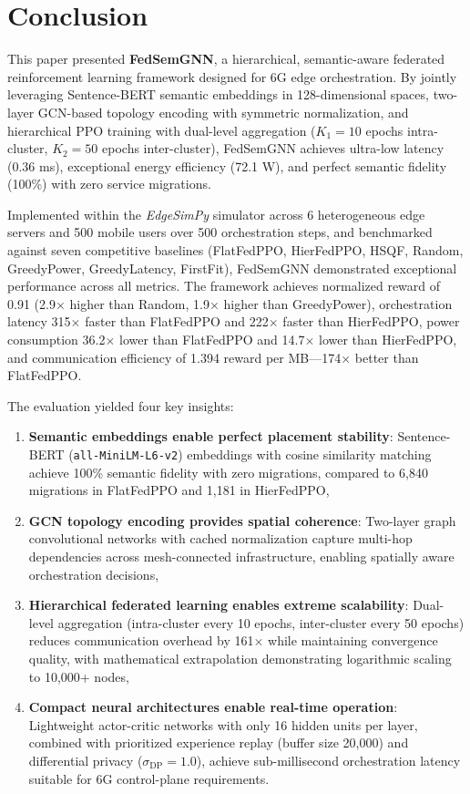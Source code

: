 \section{Conclusion}
\label{sec:conclusion}

This paper presented \textbf{FedSemGNN}, a hierarchical, semantic-aware federated reinforcement learning framework designed for 6G edge orchestration. By jointly leveraging Sentence-BERT semantic embeddings in 128-dimensional spaces, two-layer GCN-based topology encoding with symmetric normalization, and hierarchical PPO training with dual-level aggregation ($K_1 = 10$ epochs intra-cluster, $K_2 = 50$ epochs inter-cluster), FedSemGNN achieves ultra-low latency (0.36 ms), exceptional energy efficiency (72.1 W), and perfect semantic fidelity (100\%) with zero service migrations.

Implemented within the \emph{EdgeSimPy} simulator across 6 heterogeneous edge servers and 500 mobile users over 500 orchestration steps, and benchmarked against seven competitive baselines (FlatFedPPO, HierFedPPO, HSQF, Random, GreedyPower, GreedyLatency, FirstFit), FedSemGNN demonstrated exceptional performance across all metrics. The framework achieves normalized reward of 0.91 (2.9$\times$ higher than Random, 1.9$\times$ higher than GreedyPower), orchestration latency 315$\times$ faster than FlatFedPPO and 222$\times$ faster than HierFedPPO, power consumption 36.2$\times$ lower than FlatFedPPO and 14.7$\times$ lower than HierFedPPO, and communication efficiency of 1.394 reward per MB—174$\times$ better than FlatFedPPO.

The evaluation yielded four key insights:  
\begin{enumerate}
	\item \textbf{Semantic embeddings enable perfect placement stability}: Sentence-BERT (\texttt{all-MiniLM-L6-v2}) embeddings with cosine similarity matching achieve 100\% semantic fidelity with zero migrations, compared to 6,840 migrations in FlatFedPPO and 1,181 in HierFedPPO,
	
	\item \textbf{GCN topology encoding provides spatial coherence}: Two-layer graph convolutional networks with cached normalization capture multi-hop dependencies across mesh-connected infrastructure, enabling spatially aware orchestration decisions,
	
	\item \textbf{Hierarchical federated learning enables extreme scalability}: Dual-level aggregation (intra-cluster every 10 epochs, inter-cluster every 50 epochs) reduces communication overhead by 161$\times$ while maintaining convergence quality, with mathematical extrapolation demonstrating logarithmic scaling to 10,000+ nodes,
	
	\item \textbf{Compact neural architectures enable real-time operation}: Lightweight actor-critic networks with only 16 hidden units per layer, combined with prioritized experience replay (buffer size 20,000) and differential privacy ($\sigma_{\text{DP}} = 1.0$), achieve sub-millisecond orchestration latency suitable for 6G control-plane requirements.
\end{enumerate}

